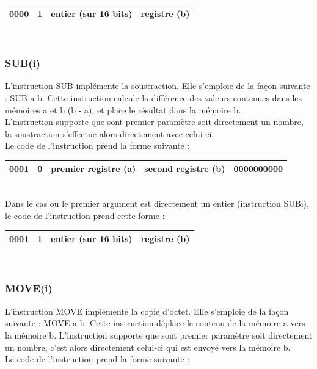 \documentclass[a4paper, 12pt, twoside]{report}
\begin{document}
\begin{tabular}{|c|c|c|c|}
  \hline
  0000 & 1 & entier (sur 16 bits) & registre (b) \\
  \hline
\end{tabular}\\

\subsubsection{SUB(i)}

L'instruction SUB implémente la soustraction. Elle s'emploie de la façon suivante :
SUB a b. Cette instruction calcule la différence des valeurs contenues dans les mémoires
a et b (b - a), et place le résultat dans la mémoire b.\\
L'instruction supporte que sont premier paramètre soit directement un nombre, la soustraction
s'effectue alors directement avec celui-ci.\\

Le code de l'instruction prend la forme suivante :

\begin{tabular}{|c|c|c|c|c|}
  \hline
  0001 & 0 & premier registre (a) & second registre (b) & 0000000000 \\
  \hline
\end{tabular}\\

Dans le cas ou le premier argument est directement un entier (instruction SUBi),
le code de l'instruction prend cette forme :

\begin{tabular}{|c|c|c|c|}
  \hline
  0001 & 1 & entier (sur 16 bits) & registre (b) \\
  \hline
\end{tabular}\\

\subsubsection{MOVE(i)}

L'instruction MOVE implémente la copie d'octet. Elle s'emploie de la façon suivante :
MOVE a b. Cette instruction déplace le contenu de la mémoire a vers la mémoire b. 
L'instruction supporte que sont premier paramètre soit directement un nombre, c'est alors 
directement celui-ci qui est envoyé vers la mémoire b.\\

Le code de l'instruction prend la forme suivante :
\end{document}
